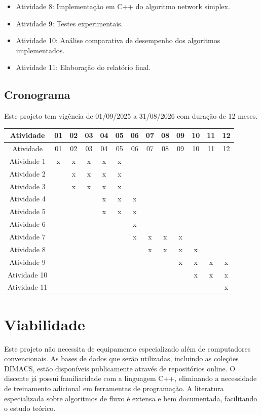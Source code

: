 \documentclass{amsart}
\begin{document}
\begin{itemize}
   A bibliografia principal é a mesma da Atividade 1.

    \item Atividade 8: Implementação em C++ do algoritmo network simplex.

    \item Atividade 9: Testes experimentais.

    \item Atividade 10: Análise comparativa de desempenho dos algoritmos implementados.

    \item Atividade 11:  Elaboração do relatório final.

    \end{itemize}

    \subsection{Cronograma}

    Este projeto tem vigência de 01/09/2025 a 31/08/2026 com duração de 12 meses.

\begin{longtable}{ |c|c|c|c|c|c|c|c|c|c|c|c|c|}
\hline
Atividade   &01&02&03&04&05&06&07&08&09&10&11&12\\ \hline
\endfirsthead

\hline
Atividade   &01&02&03&04&05&06&07&08&09&10&11&12\\ \hline
\endhead

Atividade 1 &x&x&x&x&x&&&&&&&\\ \hline
Atividade 2 &&x&x&x&x&&&&&&&\\ \hline
Atividade 3 &&x&x&x&x&&&&&&&\\ \hline
Atividade 4 &&&&x&x&x&&&&&&\\ \hline
Atividade 5 &&&&x&x&x&&&&&&\\ \hline
Atividade 6 &&&&&&x&&&&&&\\ \hline
Atividade 7 &&&&&&x&x&x&x&&&\\ \hline
Atividade 8 &&&&&&&x&x&x&x&&\\ \hline
Atividade 9 &&&&&&&&&x&x&x&x\\ \hline
Atividade 10 &&&&&&&&&&x&x&x\\ \hline
Atividade 11 &&&&&&&&&&&&x\\ \hline
\end{longtable}

\section{Viabilidade}

Este projeto não necessita de equipamento especializado além de computadores convencionais. As bases de dados que serão utilizadas, incluindo as coleções DIMACS, estão disponíveis publicamente através de repositórios online. O discente já possui familiaridade com a linguagem C++, eliminando a necessidade de treinamento adicional em ferramentas de programação. A literatura especializada sobre algoritmos de fluxo é extensa e bem documentada, facilitando o estudo teórico.



\end{document}
